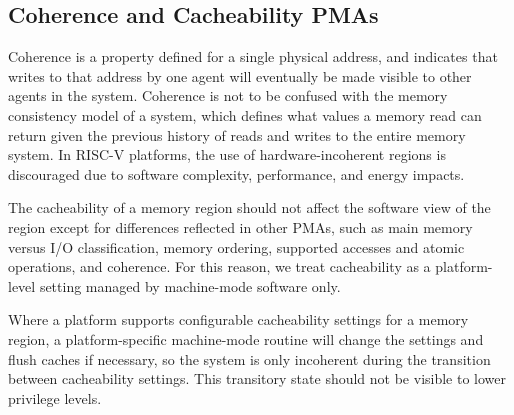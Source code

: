 \subsection{Coherence and Cacheability PMAs}

Coherence is a property defined for a single physical address, and
indicates that writes to that address by one agent will eventually be
made visible to other agents in the system.  Coherence is not to be
confused with the memory consistency model of a system, which defines
what values a memory read can return given the previous history of
reads and writes to the entire memory system.  In RISC-V platforms,
the use of hardware-incoherent regions is discouraged due to software
complexity, performance, and energy impacts.

The cacheability of a memory region should not affect the software
view of the region except for differences reflected in other PMAs,
such as main memory versus I/O classification, memory ordering,
supported accesses and atomic operations, and coherence.  For this
reason, we treat cacheability as a platform-level setting managed by
machine-mode software only.

Where a platform supports configurable cacheability settings for a
memory region, a platform-specific machine-mode routine will change
the settings and flush caches if necessary, so the system is only
incoherent during the transition between cacheability settings.  This
transitory state should not be visible to lower privilege levels.


